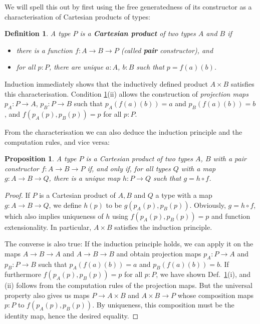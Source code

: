 \documentclass{amsart}
\theoremstyle{plain}
\numberwithin{equation}{section} %
\numberwithin{figure}{section} %
\theoremstyle{plain}
\theoremstyle{plain}
\theoremstyle{plain}
\theoremstyle{plain}
\theoremstyle{plain}
\newtheorem{prop}[thm]{Proposition} %
\theoremstyle{plain}
\newtheorem{Def}[thm]{Definition} %
\theoremstyle{remark}
\theoremstyle{remark}
\theoremstyle{remark}
\begin{document}
We will spell this out by first using the free generatedness of its constructor as a characterisation of Cartesian products of types:
\begin{Def} \label{prod-cons-char} %
A type $P$ is a \textbf{Cartesian product} of two types $A$ and $B$ if
\begin{itemize}
\item[(i)] there is a function $f : A \rightarrow B \rightarrow P$ (called \textbf{pair} constructor), and
\item[(ii)] for all $p : P$, there are unique $a : A$, $b : B$  such that $p = f(a)(b)$. 
\end{itemize}
\end{Def}

Induction immediately shows that the inductively defined product $A \times B$ satisfies this characterisation.
Condition \ref{prod-cons-char}(ii) allows the construction of \textit{projection maps} $p_A : P \rightarrow A$,
$p_B : P \rightarrow B$ such that $p_A(f(a)(b)) = a$ and $p_B(f(a)(b)) = b$, and $f(p_A(p),p_B(p)) = p$ for all $p : P$.   %

From the characterisation we can also deduce the induction principle and the computation rules, and vice versa:
\begin{prop}  \label{cons-ind-prod-Def} %
A type $P$ is a Cartesian product of two types $A$, $B$ with a pair constructor $f : A \rightarrow B \rightarrow P$ if, and only if, for all types $Q$ with a map $g : A \rightarrow B \rightarrow Q$, there is a unique map $h : P \rightarrow Q$ such that $g = h \circ f$.
\end{prop}
\begin{proof}
If $P$ is a Cartesian product of $A, B$ and $Q$ a type with a map $g : A \rightarrow B \rightarrow Q$, we define $h(p)$ to be $g(p_A(p), p_B(p))$. Obviously, $g = h \circ f$, which also implies uniqueness of $h$ using $f(p_A(p),p_B(p)) = p$ and function extensionality. In particular, $A \times B$ satisfies the induction principle.

The converse is also true: If the induction principle holds, we can apply it on the maps $A \rightarrow B \rightarrow A$ and $A \rightarrow B \rightarrow B$ and obtain projection maps $p_A : P \rightarrow A$ and $p_B : P \rightarrow B$ such that $p_A(f(a)(b)) = a$ and $p_B(f(a)(b)) = b$. If furthermore $f(p_A(p),p_B(p)) = p$ for all $p : P$, we have shown Def.~\ref{prod-cons-char}(i), and (ii) follows from the computation rules of the projection maps. But the universal property also gives us maps $P \rightarrow A \times B$ and $A \times B \rightarrow P$ whose composition maps $p : P$ to $f(p_A(p),p_B(p))$. By uniqueness, this composition must be the identity map, hence the desired equality.  
\end{proof}
\end{document}
